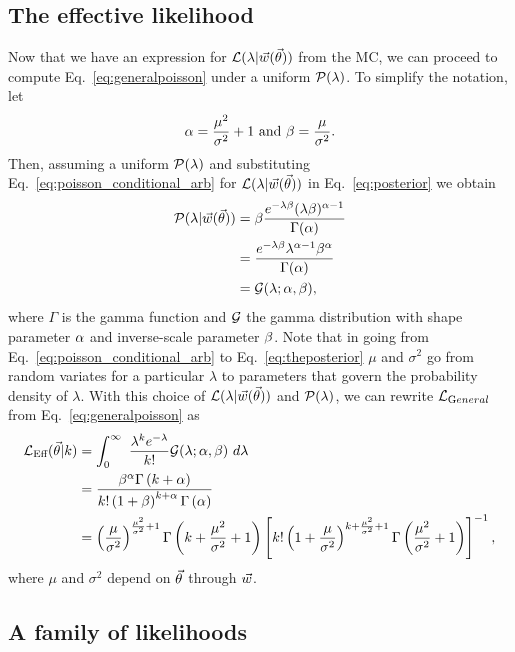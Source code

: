 \subsection{The effective likelihood\label{sec:effective}}
Now that we have an expression for $\mathcal{L}(\lambda|\vec{w}(\vec{\theta}))$ from the MC, we can proceed to compute Eq.~\eqref{eq:generalpoisson} under a uniform $\mathcal{P}(\lambda)$. To simplify the notation, let
\begin{equation}\label{eq:alphabetamc}
\alpha = \frac{\mu^2}{\sigma^2}+1~\textmd{and}~\beta=\frac{\mu}{\sigma^2}.
\end{equation}
Then, assuming a uniform $\mathcal{P}(\lambda)$ and substituting Eq.~\eqref{eq:poisson_conditional_arb} for $\mathcal{L}(\lambda|\vec{w}(\vec{\theta}))$ in Eq.~\eqref{eq:posterior} we obtain
\begin{align} \label{eq:theposterior}
\mathcal{P}(\lambda|\vec{w}(\vec{\theta})) &= \beta \frac{ e^{-\lambda \beta}(\lambda \beta )^{\alpha-1}}{\Gamma(\alpha)}\nonumber \\
&= \frac{e^{-\lambda \beta } \lambda^{\alpha-1} \beta^{\alpha}}{\Gamma(\alpha)} \nonumber \\
&= \mathcal{G}(\lambda;\alpha, \beta),
\end{align}
where $\Gamma$ is the gamma function and $\mathcal{G}$ the gamma distribution with shape parameter $\alpha$ and inverse-scale parameter $\beta$.
Note that in going from Eq.~\eqref{eq:poisson_conditional_arb} to Eq.~\eqref{eq:theposterior} $\mu$ and $\sigma^2$ go from random variates for a particular $\lambda$ to parameters that govern the probability density of $\lambda$. With this choice of $\mathcal{L}(\lambda|\vec{w}(\vec{\theta}))$ and $\mathcal{P}(\lambda)$, we can rewrite $\mathcal{L}_{\textrm General}$ from Eq.~\eqref{eq:generalpoisson} as
\begin{align}
\mathcal{L}_\textmd{Eff}(\vec{\theta}|k) &=\int_{0}^{\infty}~\frac{\lambda^k e^{-\lambda}}{k!}\mathcal{G}(\lambda;\alpha, \beta)~d\lambda \\
&= \frac{\beta^\alpha\Gamma\left(k+\alpha\right)}{k!\left(1+\beta\right)^{k+\alpha}\Gamma\left(\alpha\right)} \\
&= \left(\frac{\mu}{\sigma^2}\right)^{\frac{\mu^2}{\sigma^2}+1}\Gamma\left(k+\frac{\mu^2}{\sigma^2}+1\right)\left[k!\left(1+\frac{\mu}{\sigma^2}\right)^{k+\frac{\mu^2}{\sigma^2}+1}\Gamma\left(\frac{\mu^2}{\sigma^2}+1\right)\right]^{-1}, \label{eq:parametrizedpoisson}
\end{align}
where $\mu$ and $\sigma^2$ depend on $\vec{\theta}$ through $\vec{w}$.

\subsection{A family of likelihoods\label{sec:priors}}

